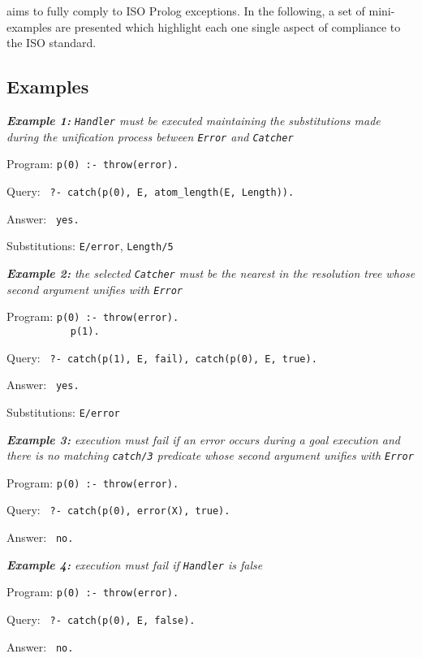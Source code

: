 \tuprolog{} aims to fully comply to ISO Prolog exceptions.
%
In the following, a set of mini-examples are presented which highlight each one single aspect of \tuprolog{} compliance to the ISO standard.

\subsection{Examples}

\medskip\noindent
\textit{\textbf{Example 1:} \texttt{Handler} must be executed maintaining the substitutions made during the unification process between \texttt{Error} and \texttt{Catcher}}

Program: \texttt{p(0) :- throw(error).}

Query: \texttt{ ?- catch(p(0), E, atom\_length(E, Length)).}

Answer: \texttt{ yes.}

Substitutions: \texttt{E/error}, \texttt{Length/5}


\medskip\noindent
\textit{\textbf{Example 2:} the selected \texttt{Catcher} must be the nearest in the resolution tree whose second argument unifies with \texttt{Error}}

Program: \texttt{p(0) :- throw(error).}\\
\mbox{\texttt{~~~~~~~~~~~}}\texttt{p(1).}

Query: \texttt{ ?- catch(p(1), E, fail),  catch(p(0), E, true).}

Answer: \texttt{ yes.}

Substitutions: \texttt{E/error}


\medskip\noindent
\textit{\textbf{Example 3:} execution must fail if an error occurs during a goal execution and there is no matching \texttt{catch/3} predicate whose second argument unifies with \texttt{Error}}

Program: \texttt{p(0) :- throw(error).}

Query: \texttt{ ?- catch(p(0), error(X), true).}

Answer: \texttt{ no.}


\medskip\noindent
\textit{\textbf{Example 4:} execution must fail if \texttt{Handler} is false}

Program: \texttt{p(0) :- throw(error).}

Query: \texttt{ ?- catch(p(0), E, false).}

Answer: \texttt{ no.}


